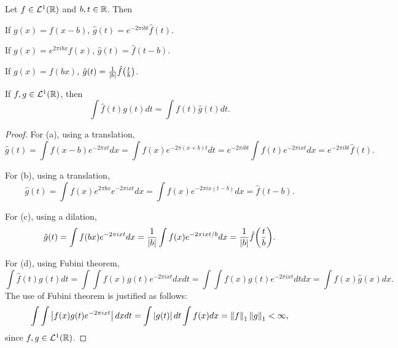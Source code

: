 \begin{proposition}\label{prop:fourier_transform_properties}
    Let $f\in\mathcal{L}^1(\mathbb{R})$ and $b,t\in\mathbb{R}$. Then 
    \begin{thmenum}
        \item If $g(x) = f(x-b)$, $\hat{g}(t) = e^{-2\pi ibt}\hat{f}(t)$. 
        \item If $g(x) = e^{2\pi ibx}f(x)$, $\hat{g}(t) = \hat{f}(t-b)$. 
        \item If $g(x) = f(bx)$, $\hat{g}(t) = \frac{1}{\abs{b}}\hat{f}\pth{\frac{t}{b}}$. 
        \item If $f,g\in\mathcal{L}^1(\mathbb{R})$, then
        \begin{equation*}
            \int \hat{f}(t)g(t)dt = \int f(t)\hat{g}(t)dt.
        \end{equation*}
    \end{thmenum}
\end{proposition}
\begin{proof}
    For (a), using a translation,
    \begin{equation*}
        \hat{g}(t) = \int f(x-b)e^{-2\pi xt}dx = \int f(x)e^{-2\pi (x+b)t}dt 
        = e^{-2\pi ibt}\int f(t)e^{-2\pi ixt}dx = e^{-2\pi ibt}\hat{f}(t).
    \end{equation*}

    For (b), using a translation,
    \begin{equation*}
        \hat{g}(t) = \int f(x)e^{2\pi bx}e^{-2\pi ixt}dx = \int f(x)e^{-2\pi ix(t-b)}dx 
        = \hat{f}(t-b).
    \end{equation*}

    For (c), using a dilation,
    \begin{equation*}
        \hat{g}(t) = \int f(bx)e^{-2\pi ixt}dx = \frac{1}{\abs{b}}\int f(x)e^{-2\pi ixt/b}dx 
        = \frac{1}{\abs{b}}\hat{f}\pth{\frac{t}{b}}.
    \end{equation*}

    For (d), using Fubini theorem, 
    \begin{equation*}
        \int \hat{f}(t)g(t)dt = \int\int f(x)g(t)e^{-2\pi ixt}dxdt 
        = \int\int f(x)g(t)e^{-2\pi ixt}dtdx 
        = \int f(x)\hat{g}(x)dx.
    \end{equation*}
    The use of Fubini theorem is justified as follows: 
    \begin{equation*}
        \int\int \left\lvert {f(x)g(t)e^{-2\pi ixt}} \right\rvert dxdt = \int \left\lvert {g(t)} \right\rvert dt\int f(x)dx = \left\lVert {f} \right\rVert_1\left\lVert {g} \right\rVert_1 < \infty,
    \end{equation*}
    since $f,g\in\mathcal{L}^1(\mathbb{R})$.
\end{proof}

